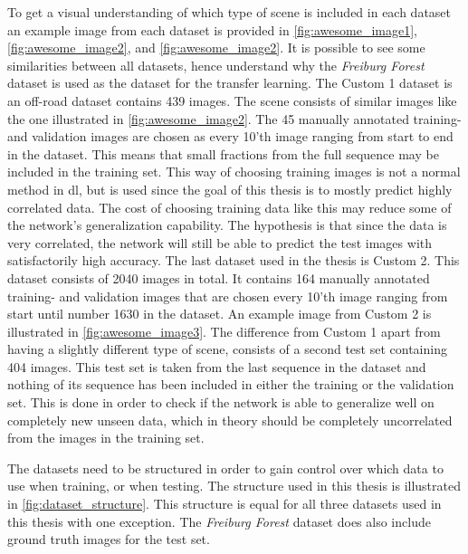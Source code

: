 \documentclass[USenglish]{ifimaster}  %
\begin{document}
To get a visual understanding of which type of scene is included in each dataset an example image from each dataset is provided in \cref{fig:awesome_image1}, \cref{fig:awesome_image2}, and \cref{fig:awesome_image2}. It is possible to see some similarities between all datasets, hence understand why the \textit{Freiburg Forest} dataset is used as the dataset for the transfer learning. The Custom 1 dataset is an off-road dataset contains 439 images. The scene consists of similar images like the one illustrated in \cref{fig:awesome_image2}. The 45 manually annotated training- and validation images are chosen as every 10'th image ranging from start to end in the dataset. This means that small fractions from the full sequence may be included in the training set. This way of choosing training images is not a normal method in \ac{dl}, but is used since the goal of this thesis is to mostly predict highly correlated data. The cost of choosing training data like this may reduce some of the network's generalization capability. The hypothesis is that since the data is very correlated, the network will still be able to predict the test images with satisfactorily high accuracy. 
\newline
\newline
The last dataset used in the thesis is Custom 2. This dataset consists of 2040 images in total. It contains 164 manually annotated training- and validation images that are chosen every 10'th image ranging from start until number 1630 in the dataset. An example image from Custom 2 is illustrated in \cref{fig:awesome_image3}. The difference from Custom 1 apart from having a slightly different type of scene, consists of a second test set containing 404 images. This test set is taken from the last sequence in the dataset and nothing of its sequence has been included in either the training or the validation set. This is done in order to check if the network is able to generalize well on completely new unseen data, which in theory should be completely uncorrelated from the images in the training set.

The datasets need to be structured in order to gain control over which data to use when training, or when testing. The structure used in this thesis is illustrated in \cref{fig:dataset_structure}. This structure is equal for all three datasets used in this thesis with one exception. The \textit{Freiburg Forest} dataset does also include ground truth images for the test set.
\end{document}
